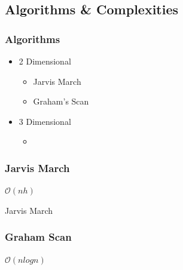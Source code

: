 \documentclass{beamer}
\begin{document}
      

\subsection{Algorithms \& Complexities}
\begin{frame}
  \frametitle{Algorithms}
  \begin{itemize}
      \item 2 Dimensional
           \begin{itemize}
               \item Jarvis March
               \item Graham's Scan
           \end{itemize}
      \item 3 Dimensional 
            \begin{itemize}
                \item 
            \end{itemize}
  \end{itemize}
\end{frame}

\begin{frame}
    \frametitle{Jarvis March}
    
    \begin{center}
    $\mathcal{O}(nh)$
    \end{center}
\end{frame}

\begin{frame}{Jarvis March}
\end{frame}


\begin{frame}
    \frametitle{Graham Scan}
    
    \begin{center}
    
        $\mathcal{O}(n log n)$
    \end{center}
\end{frame}
\end{document}
